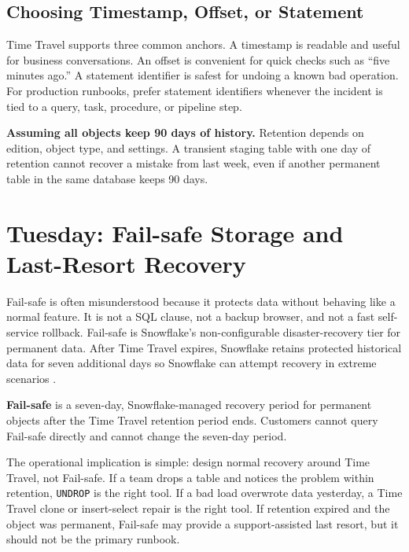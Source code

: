 \subsection{Choosing Timestamp, Offset, or Statement}
Time Travel supports three common anchors. A timestamp is readable and useful for business conversations. An offset is convenient for quick checks such as ``five minutes ago.'' A statement identifier is safest for undoing a known bad operation. For production runbooks, prefer statement identifiers whenever the incident is tied to a query, task, procedure, or pipeline step.
\begin{pitfall}
\textbf{Assuming all objects keep 90 days of history.} Retention depends on edition, object type, and settings. A transient staging table with one day of retention cannot recover a mistake from last week, even if another permanent table in the same database keeps 90 days.
\end{pitfall}
\section{Tuesday: Fail-safe Storage and Last-Resort Recovery}
Fail-safe is often misunderstood because it protects data without behaving like a normal feature. It is not a SQL clause, not a backup browser, and not a fast self-service rollback. Fail-safe is Snowflake's non-configurable disaster-recovery tier for permanent data. After Time Travel expires, Snowflake retains protected historical data for seven additional days so Snowflake can attempt recovery in extreme scenarios \cite{snowflakeFailSafeDocs}.
\begin{definitionbox}
\textbf{Fail-safe} is a seven-day, Snowflake-managed recovery period for permanent objects after the Time Travel retention period ends. Customers cannot query Fail-safe directly and cannot change the seven-day period.
\end{definitionbox}
The operational implication is simple: design normal recovery around Time Travel, not Fail-safe. If a team drops a table and notices the problem within retention, \texttt{UNDROP} is the right tool. If a bad load overwrote data yesterday, a Time Travel clone or insert-select repair is the right tool. If retention expired and the object was permanent, Fail-safe may provide a support-assisted last resort, but it should not be the primary runbook.

